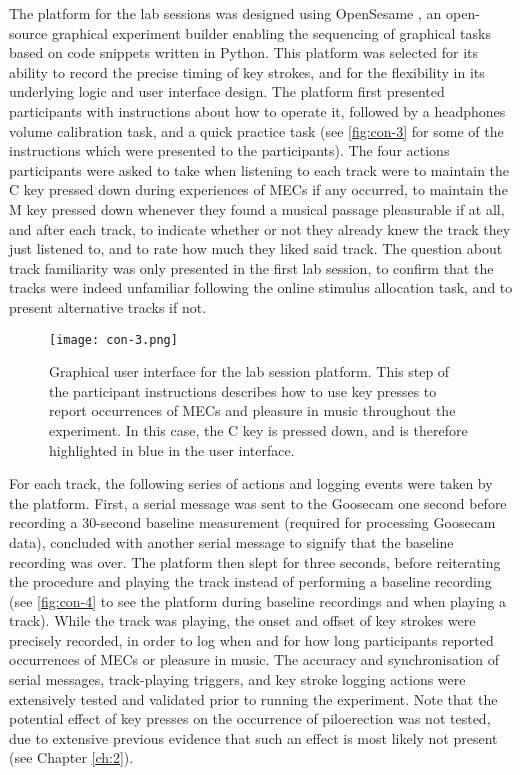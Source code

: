 The platform for the lab sessions was designed using OpenSesame \parencite{mathot2012}, an open-source graphical experiment builder enabling the sequencing of graphical tasks based on code snippets written in Python. This platform was selected for its ability to record the precise timing of key strokes, and for the flexibility in its underlying logic and user interface design. The platform first presented participants with instructions about how to operate it, followed by a headphones volume calibration task, and a quick practice task (see \autoref{fig:con-3} for some of the instructions which were presented to the participants). The four actions participants were asked to take when listening to each track were to maintain the C key pressed down during experiences of MECs if any occurred, to maintain the M key pressed down whenever they found a musical passage pleasurable if at all, and after each track, to indicate whether or not they already knew the track they just listened to, and to rate how much they liked said track. The question about track familiarity was only presented in the first lab session, to confirm that the tracks were indeed unfamiliar following the online stimulus allocation task, and to present alternative tracks if not.

\begin{figure}[t!]
\texttt{[image: con-3.png]}
\centering
\caption{Graphical user interface for the lab session platform. This step of the participant instructions describes how to use key presses to report occurrences of MECs and pleasure in music throughout the experiment. In this case, the C key is pressed down, and is therefore highlighted in blue in the user interface.}
\label{fig:con-3}
\end{figure}

For each track, the following series of actions and logging events were taken by the platform. First, a serial message was sent to the Goosecam one second before recording a 30-second baseline measurement (required for processing Goosecam data), concluded with another serial message to signify that the baseline recording was over. The platform then slept for three seconds, before reiterating the procedure and playing the track instead of performing a baseline recording (see \autoref{fig:con-4} to see the platform during baseline recordings and when playing a track). While the track was playing, the onset and offset of key strokes were precisely recorded, in order to log when and for how long participants reported occurrences of MECs or pleasure in music. The accuracy and synchronisation of serial messages, track-playing triggers, and key stroke logging actions were extensively tested and validated prior to running the experiment. Note that the potential effect of key presses on the occurrence of piloerection was not tested, due to extensive previous evidence that such an effect is most likely not present (see Chapter \ref{ch:2}).

